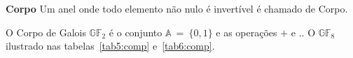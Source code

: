 \begin{definition} {\bf Corpo} \label{corpo}  Um anel onde todo elemento não nulo é invertível é chamado de Corpo.
\end{definition}

\begin{example} O Corpo de Galois $\mathbb{GF}_2$ é o conjunto $\mathbb{A}\ =\ \{0, 1\}$ e as operações $+$ e $.$. O $\mathbb{GF}_8$ ilustrado nas tabelas~\ref{tab5:comp} e~\ref{tab6:comp}.
\end{example}

   
   







